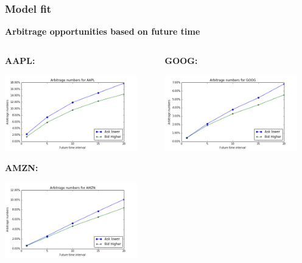 \documentclass[xcolor={x11names,svgnames,dvipsnames}]{beamer}
\begin{document}
\begin{frame}
\frametitle{Model fit}
\textbf{Arbitrage opportunities based on future time}
\begin{columns}		
		\begin{column}{.5\textwidth}
		   \textbf{AAPL:}

						\includegraphics[width=0.9\textwidth, height=0.35\textheight]{AAPL_arbitrage_time.png}

			 \textbf{AMZN:}

									\includegraphics[width=0.9\textwidth, height=0.35\textheight]{AMZN_arbitrage_time.png}

		\end{column}
		\begin{column}{.5\textwidth}
			 \textbf{GOOG:}

									\includegraphics[width=0.9\textwidth, height=0.35\textheight]{GOOG_arbitrage_time.png}


\end{column}
\end{columns}
\end{frame}
\end{document}
